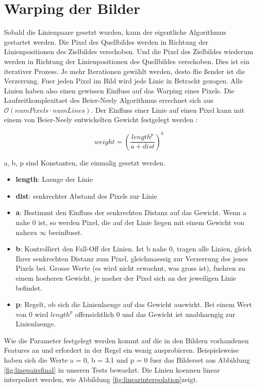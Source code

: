 \chapter{Warping der Bilder}

Sobald die Linienpaare gesetzt wurden, kann der eigentliche Algorithmus gestartet werden. Die Pixel
des Quellbildes werden in Richtung der Linienpositionen des Zielbildes verschoben. Und die Pixel
des Zielbildes wiederum werden in Richtung der Linienpositionen des Quellbildes verschoben.
Dies ist ein iterativer Prozess. Je mehr Iterationen gewählt werden, desto flie \ss ender ist
die Verzerrung.
Fuer jeden Pixel im Bild wird jede Linie in Betracht gezogen. Alle Linien haben also einen gewissen Einfluss auf
das Warping eines Pixels. Die Laufzeitkomplexitaet
des Beier-Neely Algorithmus errechnet sich aus
$\mathcal{O}(numPixels \cdot numLines)$.
Der Einfluss einer Linie auf einen Pixel kann mit einem
von Beier-Neely entwickelten Gewicht festgelegt werden
\cite{beierneely}:

\begin{equation}
	weight = \left(\frac{length^{p}}{a+dist}\right)^{b}
\end{equation}

a, b, p sind Konstanten, die einmalig gesetzt werden.

\begin{itemize}
	\item \textbf{length}: Laenge der Linie
	\item \textbf{dist}: senkrechter Abstand des Pixels zur Linie
	\item \textbf{a}: Bestimmt den Einfluss der senkrechten Distanz
	auf das Gewicht. Wenn a nahe 0 ist, so werden Pixel, die auf der
	Linie liegen mit einem Gewicht von nahezu $\infty$ beeinflusst.
	\item \textbf{b}: Kontrolliert den Fall-Off der Linien. Ist b
	nahe 0, tragen alle Linien, gleich Ihrer senkrechten Distanz zum
	Pixel, gleichmaessig zur Verzerrung des jenes Pixels bei.
	Grosse Werte (es wird nicht erwaehnt, was gross ist), fuehren
	zu einem hoeheren Gewicht, je naeher der Pixel sich an
	der jeweiligen Linie befindet.
	\item \textbf{p}: Regelt, ob sich die Linienlaenge auf das Gewicht
	auswirkt. Bei einem Wert von 0 wird $length^{p}$ offensichtlich 0
	und das Gewicht ist unabhaengig zur Linienlaenge.
\end{itemize}

Wie die Parameter festgelegt werden kommt auf die in den Bildern
vorhandenen Features an und erfordert in der Regel ein wenig
ausprobieren. Beispielsweise haben sich die Werte 
a = 0, b = 3.1 und p = 0 fuer das Bilderset aus Abbildung
\ref{fig:linepairsfinal} in unseren Tests bewaehrt.
Die Linien koennen linear interpoliert werden, wie Abbildung \ref{fig:linearinterpolation}zeigt. 

